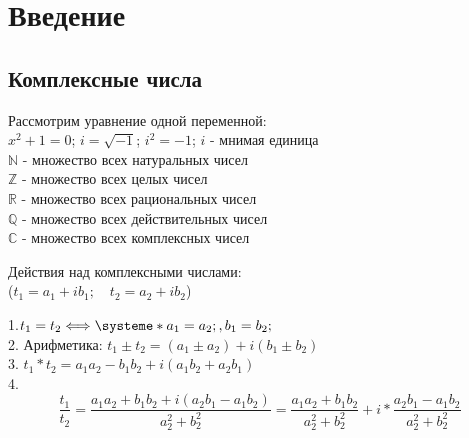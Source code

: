 \documentclass[14pt,a4paper]{scrartcl}
\theoremstyle{definition}
\newtheorem{defo}{Означення}[section]
\theoremstyle{remark}
\theoremstyle{definition}
\theoremstyle{definition}
\begin{document}
\def\be{\begin{equation}}
\def\ee{\end{equation}}

\def\bd{\begin{defo}}
\def\ed{\end{defo}}

\def\bbt{\begin{boxteo}}
\def\ebt{\end{boxteo}}

\tableofcontents
\pagebreak
\section{Введение}
\subsection{Комплексные числа}
Рассмотрим уравнение одной переменной:\\
$ x^2 + 1 = 0$; \qquad
$ i = \sqrt{-1}$; \qquad
$ i^2 = -1 $; \qquad $i$ - мнимая единица\\
$\mathbb{N}$ - множество всех натуральных чисел\\
$\mathbb{Z}$ - множество всех целых чисел\\
$\mathbb{R}$ - множество всех рациональных чисел\\
$\mathbb{Q}$ - множество всех действительных чисел\\
$\mathbb{C}$ - множество всех комплексных чисел\\
\begin{center}
Действия над комплексными числами:\\
($t_1 = a_1 + ib_1;\quad t_2 = a_2 + ib_2$)
\end{center}
1.\qquad $t_1 = t_2 \Longleftrightarrow
\systeme*{a_1 = a_2;, b_1 = b_2;}
$\\
2. Арифметика: $t_1 \pm t_2 = (a_1 \pm a_2) + i(b_1 \pm b_2)$\\
3. $t_1*t_2 = a_1a_2 - b_1b_2 + i(a_1b_2 + a_2b_1)$\\
4. \[\frac{t_1}{t_2} = \frac{a_1a_2 + b_1b_2 + i(a_2b_1 - a_1b_2)}{a_2^2 + b_2^2} = \frac{a_1a_2 + b_1b_2 }{a_2^2 + b_2^2} + i*\frac{a_2b_1 - a_1b_2}{a_2^2 + b_2^2}\]\\
\end{document}
